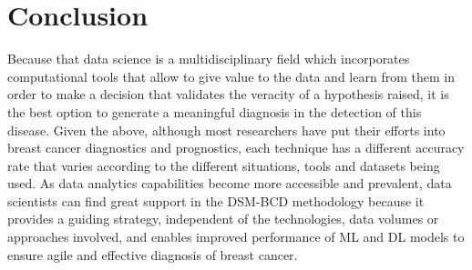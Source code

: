 \section{Conclusion}
Because that data science is a multidisciplinary field which incorporates computational tools that allow to give value to the data and learn from them in order to make a decision that validates the veracity of a hypothesis raised, it is the best option to generate a meaningful diagnosis in the detection of this disease. Given the above, although most researchers have put their efforts into breast cancer diagnostics and prognostics, each technique has a different accuracy rate that varies according to the different situations, tools and datasets being used. As data analytics capabilities become more accessible and prevalent, data scientists can find great support in the DSM-BCD methodology because it provides a guiding strategy, independent of the technologies, data volumes or approaches involved, and enables improved performance of ML and DL models to ensure agile and effective diagnosis of breast cancer.